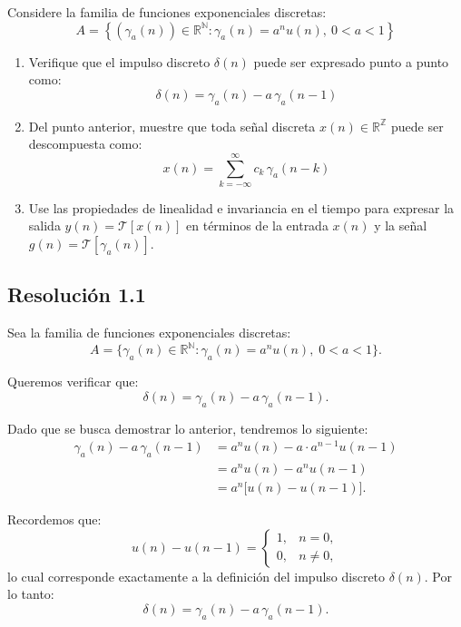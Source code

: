 \documentclass[
  11pt,
  letterpaper,
   addpoints,
   answers
  ]{exam}
\begin{document}
\begin{questions}
\question
Considere la familia de funciones exponenciales discretas:
\begin{equation}
  A = \left\{ (\gamma_a(n)) \in \mathbb{R}^{\mathbb{N}} : \gamma_a(n) = a^n u(n),\ 0 < a < 1 \right\}
\end{equation}
\begin{enumerate}
  \item Verifique que el impulso discreto $\delta(n)$ puede ser expresado punto a punto como:
  \begin{equation}
    \delta(n) = \gamma_a(n) - a\,\gamma_a(n-1)
  \end{equation}
  \item Del punto anterior, muestre que toda señal discreta $x(n) \in \mathbb{R}^{\mathbb{Z}}$ puede ser descompuesta como:
  \begin{equation}
    x(n) = \sum_{k=-\infty}^{\infty} c_k\,\gamma_a(n-k)
  \end{equation}
  \item Use las propiedades de linealidad e invariancia en el tiempo para expresar la salida $y(n) = \mathcal{T}[x(n)]$ en términos de la entrada $x(n)$ y la señal $g(n) = \mathcal{T}[\gamma_a(n)]$.
\end{enumerate}
\begin{solution}
\subsection*{Resolución 1.1}
Sea la familia de funciones exponenciales discretas:
\begin{equation}
A = \Big\{ \gamma_a(n) \in \mathbb{R}^{\mathbb{N}} : \gamma_a(n) = a^n u(n), \; 0<a<1 \Big\}.
\end{equation}

Queremos verificar que:
\begin{equation}
\delta(n) = \gamma_a(n) - a\,\gamma_a(n-1).
\end{equation}

Dado que se busca demostrar lo anterior, tendremos lo siguiente:
\begin{align}
\gamma_a(n) - a\,\gamma_a(n-1) &= a^n u(n) - a\cdot a^{n-1}u(n-1) \\
&= a^n u(n) - a^n u(n-1) \\
&= a^n\big[u(n) - u(n-1)\big].
\end{align}

Recordemos que:
\begin{equation}
u(n) - u(n-1) =
\begin{cases}
1, & n=0, \\
0, & n\neq 0,
\end{cases}
\end{equation}
lo cual corresponde exactamente a la definición del impulso discreto \(\delta(n)\). Por lo tanto:
\begin{equation}
\delta(n) = \gamma_a(n) - a\,\gamma_a(n-1).
\end{equation}


\end{solution}
\end{questions}
\end{document}
